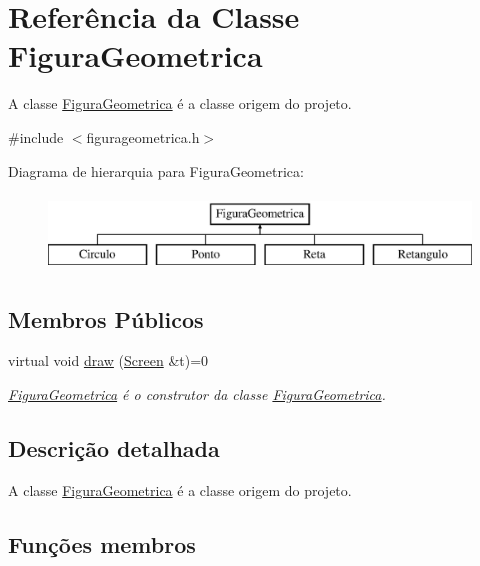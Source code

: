 \hypertarget{class_figura_geometrica}{}\section{Referência da Classe Figura\+Geometrica}
\label{class_figura_geometrica}


A classe \mbox{\hyperlink{class_figura_geometrica}{Figura\+Geometrica}} é a classe origem do projeto.  




{\ttfamily \#include $<$figurageometrica.\+h$>$}

Diagrama de hierarquia para Figura\+Geometrica\+:\begin{figure}[H]
\begin{center}
\leavevmode
\includegraphics[height=2.000000cm]{class_figura_geometrica}
\end{center}
\end{figure}
\subsection*{Membros Públicos}
\begin{DoxyCompactItemize}
\item 
virtual void \mbox{\hyperlink{class_figura_geometrica_a8ee8dedc060b6059a805ea091aef2c41}{draw}} (\mbox{\hyperlink{class_screen}{Screen}} \&t)=0
\begin{DoxyCompactList}\small\item\em \mbox{\hyperlink{class_figura_geometrica}{Figura\+Geometrica}} é o construtor da classe \mbox{\hyperlink{class_figura_geometrica}{Figura\+Geometrica}}. \end{DoxyCompactList}\end{DoxyCompactItemize}


\subsection{Descrição detalhada}
A classe \mbox{\hyperlink{class_figura_geometrica}{Figura\+Geometrica}} é a classe origem do projeto. 

\subsection{Funções membros}
\mbox{\label{class_figura_geometrica_a8ee8dedc060b6059a805ea091aef2c41}} 
